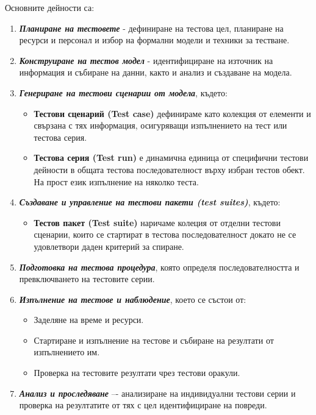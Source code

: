 \documentclass[fleqn,12pt]{article}
\begin{document}
Основните дейности са:
\begin{enumerate}
    \item \textbf{\textit{Планиране на тестовете}} - дефиниране на тестова цел, планиране на ресурси и персонал и избор на формални модели и техники за тестване.
    \item \textbf{\textit{Конструиране на тестов модел}} - идентифициране на източник на информация и събиране на данни, както и анализ и създаване на модела.
    \item \textbf{\textit{Генериране на тестови сценарии от модела}}, където:
    \begin{itemize}
        \item \textbf{Тестови сценарий (Test case)} дефинираме като колекция от елементи и свързана с тях информация, осигуряващи изпълнението на тест или тестова серия.
        \item \textbf{Тестова серия (Test run)} е динамична единица от специфични тестови дейности в общата тестова последователност върху избран тестов обект.
        На прост език изпълнение на няколко теста.
    \end{itemize}
    \item \textbf{\textit{Създаване и управление на тестови пакети (test suites)}}, където:
    \begin{itemize}
        \item \textbf{Тестов пакет (Test suite)} наричаме колеция от отделни тестови сценарии, които се стартират в тестова последователност докато не се удовлетвори даден критерий за спиране.
    \end{itemize}
    \item \textbf{\textit{Подготовка на тестова процедура}}, която определя последователността и превключването на тестовите серии.
    \item \textbf{\textit{Изпълнение на тестове и наблюдение}}, което се състои от:
    \begin{itemize}
        \item Заделяне на време и ресурси.
        \item Стартиране и изпълнение на тестове и събиране на резултати от изпълнението им.
        \item Проверка на тестовите резултати чрез тестови оракули.
    \end{itemize}
    \item \textbf{\textit{Анализ и проследяване}} –- анализиране на индивидуални тестови серии и проверка на резултатите от тях с цел идентифициране на повреди.
\end{enumerate}
\end{document}
